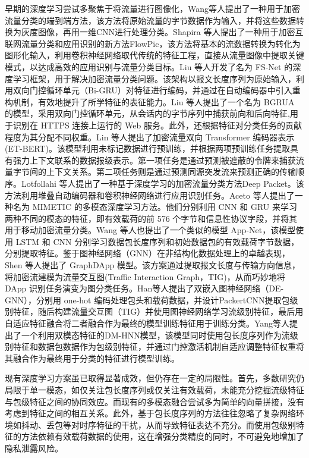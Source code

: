 早期的深度学习尝试多聚焦于将流量进行图像化，Wang等人提出了一种用于加密流量分类的端到端方法，该方法将原始流量的字节数据作为输入，并将这些数据转换为灰度图像，再用一维CNN进行处理分类\cite{wang2017end}。Shapira 等人提出了一种用于加密互联网流量分类和应用识别的新方法FlowPic，该方法将基本的流数据转换为转化为图形化输入，利用卷积神经网络取代传统的特征工程，直接从流量图像中提取关键模式，以达成高效的应用识别与流量分类目标\cite{shapira2021flowpic}。Liu 等人开发了名为 FS-Net 的深度学习框架，用于解决加密流量分类问题。该架构以报文长度序列为原始输入，利用双向门控循环单元（Bi-GRU）对特征进行编码，并通过在自动编码器中引入重构机制，有效地提升了所学特征的表征能力\cite{liu2019fs}。Liu 等人提出了一个名为 BGRUA 的模型，采用双向门控循环单元，从会话内的字节序列中捕获前向和后向特征,用于识别在 HTTPS 连接上运行的 Web 服务。此外，还根据特征对分类任务的贡献程度为其分配不同权重\cite{liu2020attention}。Lin 等人提出了加密流量双向 Transformer 编码器表示(ET-BERT)。该模型利用未标记数据进行预训练，并根据两项预训练任务提取具有强力上下文联系的数据报级表示。第一项任务是通过预测被遮蔽的令牌来捕获流量字节间的上下文关系。第二项任务则是通过预测同源突发流来预测正确的传输顺序\cite{lin2022bert}。Lotfollahi 等人提出了一种基于深度学习的加密流量分类方法Deep Packet。该方法利用堆叠自动编码器和卷积神经网络进行应用识别任务\cite{lotfollahi2020deep}。Aceto 等人提出了一种名为 MIMETIC 的多模态深度学习方法。他们分别利用 CNN 和 GRU 来学习两种不同的模态的特征，即有效载荷的前 576 个字节和信息性协议字段，并将其用于移动加密流量分类\cite{aceto2019mimetic}。Wang 等人也提出了一个类似的模型 App-Net，该模型使用 LSTM 和 CNN 分别学习数据包长度序列和初始数据包的有效载荷字节数据，分别提取特征\cite{wang2020app}。鉴于图神经网络（GNN）在非结构化数据处理上的卓越表现，Shen 等人提出了 GraphDApp 模型。该方案通过提取报文长度与传输方向信息，将加密流建模为流量交互图(Traffic Interaction Graph，TIG)，从而巧妙地将 DApp 识别任务演变为图分类任务\cite{shen2021accurate}。Han等人提出了双嵌入图神经网络（DE-GNN），分别用 one-hot 编码处理包头和载荷数据，并设计PackertCNN提取包级别特征，随后构建流量交互图（TIG）并使用图神经网络学习流级别特征，最后用自适应特征融合将二者融合作为最终的模型训练特征用于训练分类\cite{han2024gnn}。Yang等人提出了一个利用双模态特征的DM-HNN模型，该模型同时使用包长度序列作为流级别特征和数据包数据作为包级别特征，并通过门控激活机制自适应调整特征权重将其融合作为最终用于分类的特征进行模型训练\cite{yang2023network}。

现有深度学习方案虽已取得显著成效，但仍存在一定的局限性。首先，多数研究仍局限于单一模态，如仅关注包长度序列或仅关注有效载荷，未能充分挖掘流级特征与包级特征之间的协同效应。而现有的多模态融合尝试多为简单的向量拼接，没有考虑到特征之间的相互关系\cite{wang2024combine}。此外，基于包长度序列的方法往往忽略了复杂网络环境如抖动、丢包等对时序特征的干扰，从而导致特征表达不充分。而使用包级别特征的方法依赖有效载荷数据的使用，这在增强分类精度的同时，不可避免地增加了隐私泄露风险。

